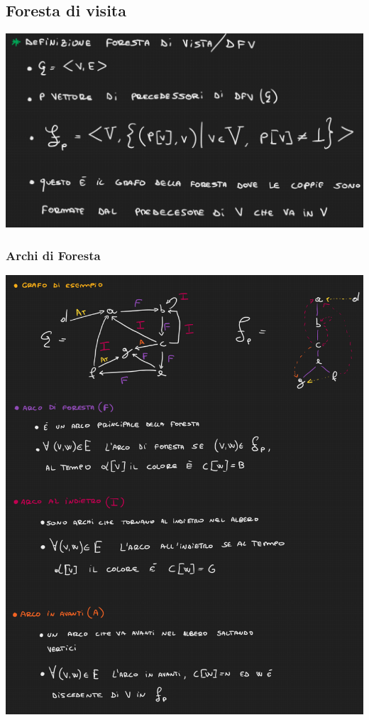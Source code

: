 \newpage
\subsection{Foresta di visita}

\begin{center}
    \includegraphics[scale = 0.5]{Capitoli/Grafi/Esempi/Foresta.png}
\end{center}
\subsubsection{Archi di Foresta}
\begin{center}
    \includegraphics[scale = 0.6]{Capitoli/Grafi/Esempi/ArchiDiForesta.png}
\end{center}


